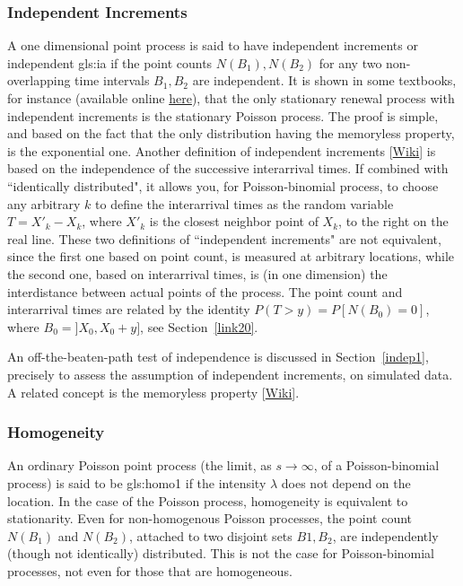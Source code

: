 \documentclass[10pt]{article}
\begin{document}
\subsubsection{Independent Increments}\label{indinc}

A one dimensional point process is said to have \textcolor{index}{independent increments}
or independent \gls{gls:ia} 
if the point counts $N(B_1), N(B_2)$ for any two non-overlapping time intervals
 $B_1,B_2$ are independent.  It is shown in some textbooks, for instance \cite{karl} (available online \href{http://www.columbia.edu/~ks20/stochastic-I/stochastic-I-PP.pdf}{here}), that the only stationary
\textcolor{index}{renewal process} with independent increments is the stationary Poisson process. The proof is simple, and based on the fact that the only distribution having the memoryless property, is the exponential one. Another definition of independent increments [\href{https://en.wikipedia.org/wiki/Independent_increments}{Wiki}] is based on the independence of the successive interarrival times. If combined with ``identically distributed", it allows you, for Poisson-binomial process, to choose any arbitrary $k$ to define the interarrival times as the random variable $T=X'_k-X_k$, where $X'_k$ is the closest neighbor point of $X_k$, to the right on the real line. These two definitions of ``independent increments" are not equivalent, since the first one based on point count, is measured at arbitrary locations, while the second one, based on interarrival times, is (in one dimension) the interdistance between actual points of the process. The point count and interarrival times are related by the identity $P(T>y)=P[N(B_0)=0]$, where $B_0=]X_0,X_0+y]$, see Section~\ref{link20}.

An off-the-beaten-path test of independence is discussed in Section~\ref{indep1}, precisely to assess the assumption of independent increments, on simulated data. A related concept is the \textcolor{index}{memoryless property} [\href{https://en.wikipedia.org/wiki/Memorylessness}{Wiki}].


\subsubsection{Homogeneity}\label{homgprop}

An ordinary Poisson point process (the limit, as $s\rightarrow\infty$, of a Poisson-binomial process) is said to be
\gls{gls:homo1} %
if the intensity $\lambda$ does not depend on the location. In the case of the Poisson process, homogeneity is equivalent to stationarity. Even for non-homogenous Poisson processes,
the point count $N(B_1)$ and $N(B_2)$, attached to two disjoint sets $B1,B_2$, are independently (though not identically) distributed. This is not the case for Poisson-binomial processes, not even for those that are homogeneous.
\end{document}
